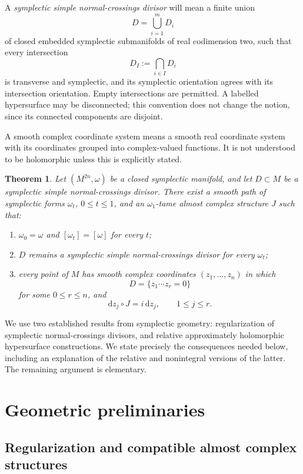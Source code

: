 \documentclass[11pt]{article}
\newtheorem{theorem}{Theorem}[section]
\theoremstyle{definition}
\theoremstyle{remark}
\newcommand{\dd}{\mathrm d}
\begin{document}
A \emph{symplectic simple normal-crossings divisor} will mean a finite
union
\[
D=\bigcup_{i=1}^{m}D_i
\]
of closed embedded symplectic submanifolds of real codimension two,
such that every intersection
\[
D_I:=\bigcap_{i\in I}D_i
\]
is transverse and symplectic, and its symplectic orientation agrees
with its intersection orientation.  Empty intersections are permitted.
A labelled hypersurface may be disconnected; this convention does not
change the notion, since its connected components are disjoint.

A smooth complex coordinate system means a smooth real coordinate
system with its coordinates grouped into complex-valued functions.
It is not understood to be holomorphic unless this is explicitly
stated.

\begin{theorem}\label{thm:main}
Let $(M^{2n},\omega)$ be a closed symplectic manifold, and let
$D\subset M$ be a symplectic simple normal-crossings divisor.
There exist a smooth path of symplectic forms $\omega_t$, $0\leq t\leq1$,
and an $\omega_1$-tame almost complex structure $J$ such that:
\begin{enumerate}[label=\textup{(\roman*)}]
\item $\omega_0=\omega$ and $[\omega_t]=[\omega]$ for every $t$;
\item $D$ remains a symplectic simple normal-crossings divisor for
      every $\omega_t$;
\item every point of $M$ has smooth complex coordinates
      $(z_1,\ldots,z_n)$ in which
      \[
      D=\{z_1\cdots z_r=0\}
      \]
      for some $0\leq r\leq n$, and
      \[
      \dd z_j\circ J=i\,\dd z_j,\qquad 1\leq j\leq r.
      \]
\end{enumerate}
\end{theorem}

We use two established results from symplectic geometry:
regularization of symplectic normal-crossings divisors, and relative
approximately holomorphic hypersurface constructions. We state
precisely the consequences needed below, including an explanation of
the relative and nonintegral versions of the latter.  The remaining
argument is elementary.

\section{Geometric preliminaries}

\subsection{Regularization and compatible almost complex structures}
\end{document}
